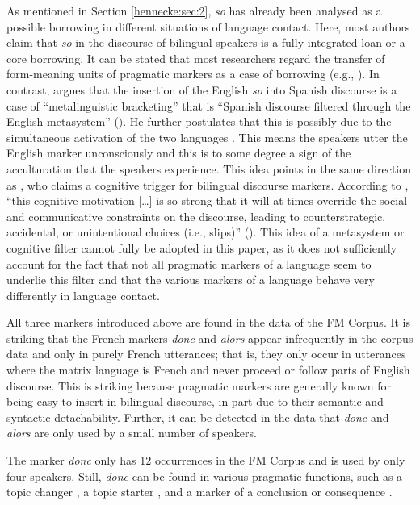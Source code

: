 \documentclass[output=paper]{langscibook}
\begin{document}
As mentioned in Section \ref{hennecke:sec:2}, \textit{so} has already been analysed as a possible borrowing in different situations of language contact. Here, most authors claim that \textit{so} in the discourse of bilingual speakers is a fully integrated loan or a core borrowing. It can be stated that most researchers regard the transfer of form-meaning units of pragmatic markers as a case of borrowing (e.g., \citealt{Mougeon.1991,SilvaCorvalan.1995,Torres.2002,Torres.2008}). In contrast, \citeauthor{Lipski.2005} argues that the insertion of the English \textit{so} into Spanish discourse is a case of “metalinguistic bracketing” that is “Spanish discourse filtered through the English metasystem” (\citeyear[13]{Lipski.2005}). He further postulates that this is possibly due to the simultaneous activation of the two languages \citep[6]{Lipski.2005}. This means the speakers utter the English marker unconsciously and this is to some degree a sign of the acculturation that the speakers experience. This idea points in the same direction as \citet{Matras.2000}, who claims a cognitive trigger for bilingual discourse markers. According to \citeauthor{Matras.2000}, “this cognitive motivation […] is so strong that it will at times override the social and communicative constraints on the discourse, leading to counterstrategic, accidental, or unintentional choices (i.e., slips)” (\citeyear[514]{Matras.2000}). This idea of a metasystem or cognitive filter cannot fully be adopted in this paper, as it does not sufficiently account for the fact that not all pragmatic markers of a language seem to underlie this filter and that the various markers of a language behave very differently in language contact.

All three markers introduced above are found in the data of the FM Corpus. It is striking that the French markers \textit{donc} and \textit{alors} appear infrequently in the corpus data and only in purely French utterances; that is, they only occur in utterances where the matrix language is French and never proceed or follow parts of English discourse. This is striking because pragmatic markers are generally known for being easy to insert in bilingual discourse, in part due to their semantic and syntactic detachability. Further, it can be detected in the data that \textit{donc} and \textit{alors} are only used by a small number of speakers.

The marker \textit{donc} only has 12 occurrences in the FM Corpus and is used by only four speakers. Still, \textit{donc} can be found in various pragmatic functions, such as a topic changer , a topic starter , and a marker of a conclusion or consequence .
\end{document}
